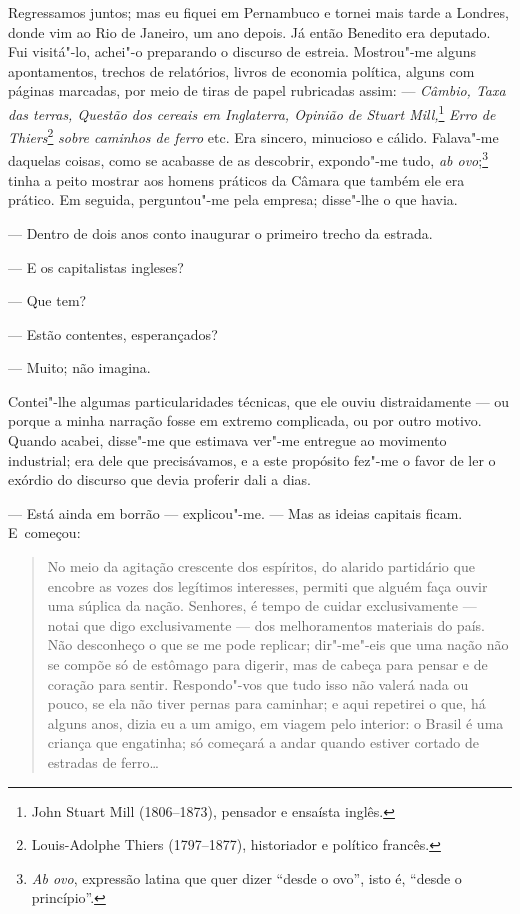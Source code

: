 \begin{linenumbers}
Regressamos juntos; mas eu fiquei em Pernambuco e tornei mais tarde a
Londres, donde vim ao Rio de Janeiro, um ano depois. Já então Benedito
era deputado. Fui visitá"-lo, achei"-o preparando o discurso de estreia.
Mostrou"-me alguns apontamentos, trechos de relatórios, livros de
economia política, alguns com páginas marcadas, por meio de tiras de
papel rubricadas assim: --- \emph{Câmbio, Taxa das terras, Questão dos
cereais em Inglaterra, Opinião de Stuart Mill,}\footnote{John Stuart Mill
  (1806--1873), pensador e ensaísta inglês.} \emph{Erro de
Thiers}\footnote{Louis-Adolphe Thiers (1797--1877), historiador e
  político francês.} \emph{sobre caminhos de ferro} etc. Era sincero,
minucioso e cálido. Falava"-me daquelas coisas, como se acabasse de as
descobrir, expondo"-me tudo, \emph{ab ovo};\footnote{\emph{Ab ovo},
  expressão latina que quer dizer ``desde o ovo'', isto é, ``desde o
  princípio''.} tinha a peito mostrar aos homens práticos da Câmara que
também ele era prático. Em seguida, perguntou"-me pela empresa; disse"-lhe
o que havia.

--- Dentro de dois anos conto inaugurar o primeiro trecho da estrada.

--- E os capitalistas ingleses?

--- Que tem?

--- Estão contentes, esperançados?

--- Muito; não imagina.

Contei"-lhe algumas particularidades técnicas, que ele ouviu
distraidamente --- ou porque a minha narração fosse em extremo
complicada, ou por outro motivo. Quando acabei, disse"-me que estimava
ver"-me entregue ao movimento industrial; era dele que precisávamos, e a
este propósito fez"-me o favor de ler o exórdio do discurso que devia
proferir dali a dias.

--- Está ainda em borrão --- explicou"-me. --- Mas as ideias capitais ficam.
E~começou:

\begin{quote}
No meio da agitação crescente dos espíritos, do alarido partidário que
encobre as vozes dos legítimos interesses, permiti que alguém faça ouvir
uma súplica da nação. Senhores, é tempo de cuidar exclusivamente ---
notai que digo exclusivamente --- dos melhoramentos materiais do país.
Não desconheço o que se me pode replicar; dir"-me"-eis que uma nação não
se compõe só de estômago para digerir, mas de cabeça para pensar e de
coração para sentir. Respondo"-vos que tudo isso não valerá nada ou
pouco, se ela não tiver pernas para caminhar; e aqui repetirei o que, há
alguns anos, dizia eu a um amigo, em viagem pelo interior: o Brasil é
uma criança que engatinha; só começará a andar quando estiver cortado de
estradas de ferro\ldots{}
\end{quote}


\end{linenumbers}
